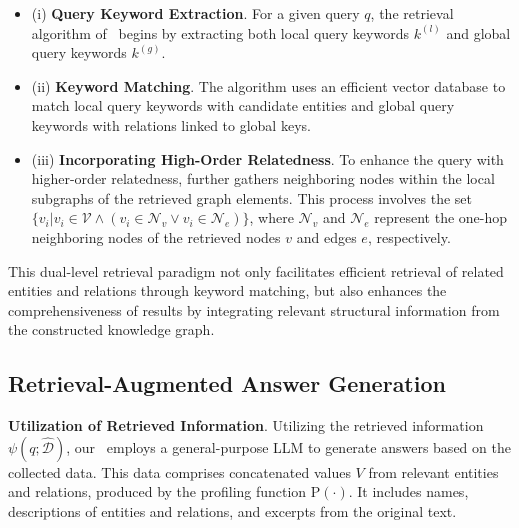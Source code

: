 \begin{itemize}[leftmargin=*]

\item (i) \textbf{Query Keyword Extraction}. For a given query $q$, the retrieval algorithm of \model\ begins by extracting both local query keywords $k^{(l)}$ and global query keywords $k^{(g)}$.

\item (ii) \textbf{Keyword Matching}. The algorithm uses an efficient vector database to match local query keywords with candidate entities and global query keywords with relations linked to global keys.

\item (iii) \textbf{Incorporating High-Order Relatedness}. To enhance the query with higher-order relatedness, \model further gathers neighboring nodes within the local subgraphs of the retrieved graph elements. This process involves the set $\{v_i | v_i \in \mathcal{V} \land (v_i \in \mathcal{N}_v \lor v_i \in \mathcal{N}_e)\}$, where $\mathcal{N}_v$ and $\mathcal{N}_e$ represent the one-hop neighboring nodes of the retrieved nodes $v$ and edges $e$, respectively.

\end{itemize}

This dual-level retrieval paradigm not only facilitates efficient retrieval of related entities and relations through keyword matching, but also enhances the comprehensiveness of results by integrating relevant structural information from the constructed knowledge graph.


\subsection{Retrieval-Augmented Answer Generation}
\textbf{Utilization of Retrieved Information}. Utilizing the retrieved information $\psi(q;\hat{\mathcal{D}})$, our \model\ employs a general-purpose LLM to generate answers based on the collected data. This data comprises concatenated values $V$ from relevant entities and relations, produced by the profiling function $\text{P}(\cdot)$. It includes names, descriptions of entities and relations, and excerpts from the original text.

